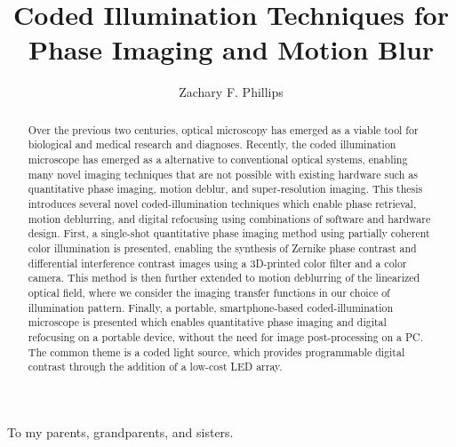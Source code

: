 \documentclass[masters]{ucbmasters}
\begin{document}

\title{Coded Illumination Techniques for Phase Imaging and Motion Blur}
\author{Zachary F. Phillips}


\maketitle


\copyrightpage

\begin{abstract}

Over the previous two centuries, optical microscopy has emerged as a viable tool for biological and medical research and diagnoses. Recently, the coded illumination microscope has emerged as a alternative to conventional optical systems, enabling many novel imaging techniques that are not possible with existing hardware such as quantitative phase imaging, motion deblur, and super-resolution imaging. This thesis introduces several novel coded-illumination techniques which enable phase retrieval, motion deblurring, and digital refocusing using combinations of software and hardware design. First, a single-shot quantitative phase imaging method using partially coherent color illumination is presented, enabling the synthesis of Zernike phase contrast and differential interference contrast images using a 3D-printed color filter and a color camera. This method is then further extended to motion deblurring of the linearized optical field, where we consider the imaging transfer functions in our choice of illumination pattern. Finally, a portable, smartphone-based coded-illumination microscope is presented which enables quantitative phase imaging and digital refocusing on a portable device, without the need for image post-processing on a PC. The common theme is a coded light source, which provides programmable digital contrast through the addition of a low-cost LED array. 

\end{abstract}

\begin{frontmatter}

\begin{dedication}
\null\vfil
\begin{center}
To my parents, grandparents, and sisters.
\end{center}
\vfil\null
\end{dedication}


\tableofcontents
\listoffigures

\end{frontmatter}

\pagestyle{headings}









\end{document}
